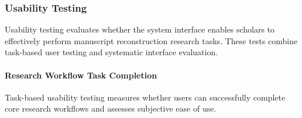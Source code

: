 \documentclass[12pt, titlepage]{article}
\begin{document}
\subsubsection{Usability Testing}

Usability testing evaluates whether the system interface enables scholars to effectively perform manuscript reconstruction research tasks. These tests combine task-based user testing and systematic interface evaluation.

\paragraph{Research Workflow Task Completion}

Task-based usability testing measures whether users can successfully complete core research workflows and assesses subjective ease of use.
\end{document}

